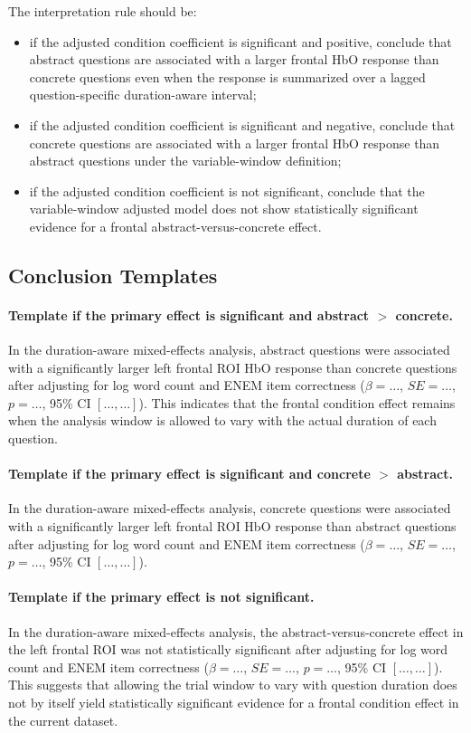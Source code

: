 \documentclass[11pt]{article}
\begin{document}
The interpretation rule should be:
\begin{itemize}
    \item if the adjusted condition coefficient is significant and positive, conclude that abstract
    questions are associated with a larger frontal HbO response than concrete questions even when
    the response is summarized over a lagged question-specific duration-aware interval;
    \item if the adjusted condition coefficient is significant and negative, conclude that concrete
    questions are associated with a larger frontal HbO response than abstract questions under the
    variable-window definition;
    \item if the adjusted condition coefficient is not significant, conclude that the variable-window
    adjusted model does not show statistically significant evidence for a frontal abstract-versus-concrete effect.
\end{itemize}

\subsection{Conclusion Templates}

\paragraph{Template if the primary effect is significant and abstract \(>\) concrete.}
In the duration-aware mixed-effects analysis, abstract questions were associated with a significantly
larger left frontal ROI HbO response than concrete questions after adjusting for log word count and
ENEM item correctness
(\(\beta=\ldots\), \(SE=\ldots\), \(p=\ldots\), 95\% CI \([\ldots,\ldots]\)).
This indicates that the frontal condition effect remains when the analysis window is allowed to vary
with the actual duration of each question.

\paragraph{Template if the primary effect is significant and concrete \(>\) abstract.}
In the duration-aware mixed-effects analysis, concrete questions were associated with a significantly
larger left frontal ROI HbO response than abstract questions after adjusting for log word count and
ENEM item correctness
(\(\beta=\ldots\), \(SE=\ldots\), \(p=\ldots\), 95\% CI \([\ldots,\ldots]\)).

\paragraph{Template if the primary effect is not significant.}
In the duration-aware mixed-effects analysis, the abstract-versus-concrete effect in the left frontal ROI
was not statistically significant after adjusting for log word count and ENEM item correctness
(\(\beta=\ldots\), \(SE=\ldots\), \(p=\ldots\), 95\% CI \([\ldots,\ldots]\)).
This suggests that allowing the trial window to vary with question duration does not by itself yield
statistically significant evidence for a frontal condition effect in the current dataset.
\end{document}
